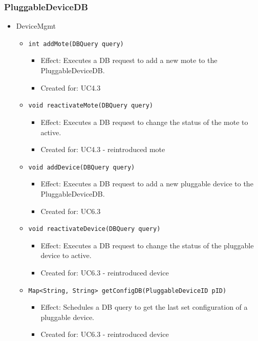     \subsubsection{PluggableDeviceDB}
        \begin{itemize}
        	\item DeviceMgmt
        	\begin{itemize}
                \item \texttt{int addMote(DBQuery query)}
            		\begin{itemize}
            			\item Effect: Executes a DB request to add a new mote to the PluggableDeviceDB.
            			\item Created for: UC4.3
            		\end{itemize}
                \item \texttt{void reactivateMote(DBQuery query)}
                    \begin{itemize}
                        \item Effect: Executes a DB request to change the status of the mote to active.
                        \item Created for: UC4.3 - reintroduced mote
                    \end{itemize}
                \item \texttt{void addDevice(DBQuery query)}
                    \begin{itemize}
                        \item Effect: Executes a DB request to add a new pluggable device to the PluggableDeviceDB.
                        \item Created for: UC6.3
                    \end{itemize}
                \item \texttt{void reactivateDevice(DBQuery query)}
                    \begin{itemize}
                        \item Effect: Executes a DB request to change the status of the pluggable device to active.
                        \item Created for: UC6.3 - reintroduced device
                    \end{itemize}
                \item \texttt{Map<String, String> getConfigDB(PluggableDeviceID pID)}
                    \begin{itemize}
                        \item Effect: Schedules a DB query to get the last set configuration of a pluggable device.
                        \item Created for: UC6.3 - reintroduced device
                    \end{itemize}
        	\end{itemize}


\end{itemize}
